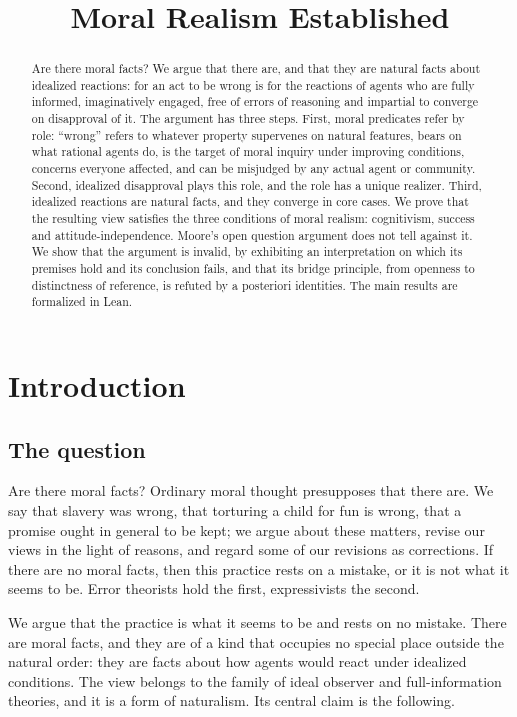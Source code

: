 \documentclass{situationist-preprint}
\title{Moral Realism Established}
\begin{document}
\maketitle

\begin{abstract}
Are there moral facts? We argue that there are, and that they are natural facts about idealized reactions: for an act to be wrong is for the reactions of agents who are fully informed, imaginatively engaged, free of errors of reasoning and impartial to converge on disapproval of it. The argument has three steps. First, moral predicates refer by role: \enquote{wrong} refers to whatever property supervenes on natural features, bears on what rational agents do, is the target of moral inquiry under improving conditions, concerns everyone affected, and can be misjudged by any actual agent or community. Second, idealized disapproval plays this role, and the role has a unique realizer. Third, idealized reactions are natural facts, and they converge in core cases. We prove that the resulting view satisfies the three conditions of moral realism: cognitivism, success and attitude-independence. Moore's open question argument does not tell against it. We show that the argument is invalid, by exhibiting an interpretation on which its premises hold and its conclusion fails, and that its bridge principle, from openness to distinctness of reference, is refuted by a posteriori identities. The main results are formalized in Lean.
\end{abstract}

\section{Introduction}

\subsection{The question}

Are there moral facts? Ordinary moral thought presupposes that there are. We say that slavery was wrong, that torturing a child for fun is wrong, that a promise ought in general to be kept; we argue about these matters, revise our views in the light of reasons, and regard some of our revisions as corrections. If there are no moral facts, then this practice rests on a mistake, or it is not what it seems to be. Error theorists hold the first, expressivists the second.

We argue that the practice is what it seems to be and rests on no mistake. There are moral facts, and they are of a kind that occupies no special place outside the natural order: they are facts about how agents would react under idealized conditions. The view belongs to the family of ideal observer and full-information theories, and it is a form of naturalism. Its central claim is the following.
\end{document}
